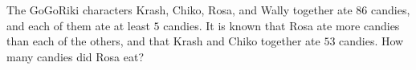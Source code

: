 The GoGoRiki characters Krash, Chiko, Rosa, and Wally together ate $86$ candies, and each of them ate at least $5$ candies. It is known that Rosa ate more candies than each of the others, and that Krash and Chiko together ate $53$ candies. How many candies did Rosa eat?
